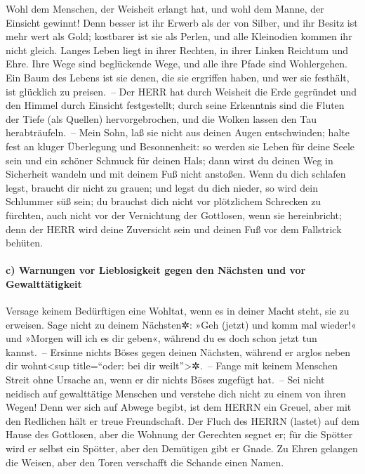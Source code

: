 Wohl dem Menschen, der Weisheit erlangt hat, und wohl dem
Manne, der Einsicht gewinnt! Denn besser ist ihr Erwerb
als der von Silber, und ihr Besitz ist mehr wert als Gold;
kostbarer ist sie als Perlen, und alle Kleinodien kommen
ihr nicht gleich. Langes Leben liegt in ihrer Rechten, in
ihrer Linken Reichtum und Ehre. Ihre Wege sind
beglückende Wege, und alle ihre Pfade sind Wohlergehen.
Ein Baum des Lebens ist sie denen, die sie ergriffen
haben, und wer sie festhält, ist glücklich zu preisen.~--
Der HERR hat durch Weisheit die Erde gegründet und den
Himmel durch Einsicht festgestellt; durch seine
Erkenntnis sind die Fluten der Tiefe (als Quellen) hervorgebrochen, und
die Wolken lassen den Tau herabträufeln.~-- Mein Sohn,
laß sie nicht aus deinen Augen entschwinden; halte fest an kluger
Überlegung und Besonnenheit: so werden sie Leben für
deine Seele sein und ein schöner Schmuck für deinen Hals;
dann wirst du deinen Weg in Sicherheit wandeln und mit
deinem Fuß nicht anstoßen. Wenn du dich schlafen legst,
braucht dir nicht zu grauen; und legst du dich nieder, so wird dein
Schlummer süß sein; du brauchst dich nicht vor
plötzlichem Schrecken zu fürchten, auch nicht vor der Vernichtung der
Gottlosen, wenn sie hereinbricht; denn der HERR wird
deine Zuversicht sein und deinen Fuß vor dem Fallstrick behüten.

\hypertarget{c-warnungen-vor-lieblosigkeit-gegen-den-nuxe4chsten-und-vor-gewalttuxe4tigkeit}{%
\paragraph{c) Warnungen vor Lieblosigkeit gegen den Nächsten und vor
Gewalttätigkeit}\label{c-warnungen-vor-lieblosigkeit-gegen-den-nuxe4chsten-und-vor-gewalttuxe4tigkeit}}

Versage keinem Bedürftigen eine Wohltat, wenn es in
deiner Macht steht, sie zu erweisen. Sage nicht zu deinem
Nächsten✲: »Geh (jetzt) und komm mal wieder!« und »Morgen will ich es
dir geben«, während du es doch schon jetzt tun kannst.~--
Ersinne nichts Böses gegen deinen Nächsten, während er
arglos neben dir wohnt\textless sup title=``oder: bei dir
weilt''\textgreater✲.~-- Fange mit keinem Menschen Streit
ohne Ursache an, wenn er dir nichts Böses zugefügt hat.~--
Sei nicht neidisch auf gewalttätige Menschen und verstehe
dich nicht zu einem von ihren Wegen! Denn wer sich auf
Abwege begibt, ist dem HERRN ein Greuel, aber mit den Redlichen hält er
treue Freundschaft. Der Fluch des HERRN (lastet) auf dem
Hause des Gottlosen, aber die Wohnung der Gerechten segnet er;
für die Spötter wird er selbst ein Spötter, aber den
Demütigen gibt er Gnade. Zu Ehren gelangen die Weisen,
aber den Toren verschafft die Schande einen Namen.

